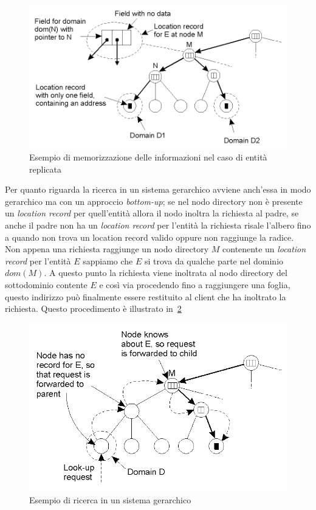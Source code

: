 \begin{figure}
\centering
\includegraphics[scale=0.5]{img/sottodominio.png}
\caption{Esempio di memorizzazione delle informazioni nel caso di entità replicata}\label{img:sottodomini}
\end{figure}
Per quanto riguarda la ricerca in un sistema gerarchico avviene anch'essa in modo gerarchico ma con un approccio \emph{bottom-up}; se nel nodo directory non è presente un \emph{location record} per quell'entità allora il nodo inoltra la richiesta al padre, se anche il padre non ha un \emph{location record} per l'entità la richiesta risale l'albero fino a quando non trova un location record valido oppure non raggiunge la radice. Non appena una richiesta raggiunge un nodo directory $M$ contenente un \emph{location record} per l'entità $E$ sappiamo che $E$ si trova da qualche parte nel dominio $dom(M)$. A questo punto la richiesta viene inoltrata al nodo directory del sottodominio contente $E$ e così via procedendo fino a raggiungere una foglia, questo indirizzo può finalmente essere restituito al client che ha inoltrato la richiesta. Questo procedimento è illustrato in \figurename\,\ref{img:ricerca}
\begin{figure}
\centering
\includegraphics[scale=0.5]{img/ricerca.png}
\caption{Esempio di ricerca in un sistema gerarchico}\label{img:ricerca}
\end{figure}
